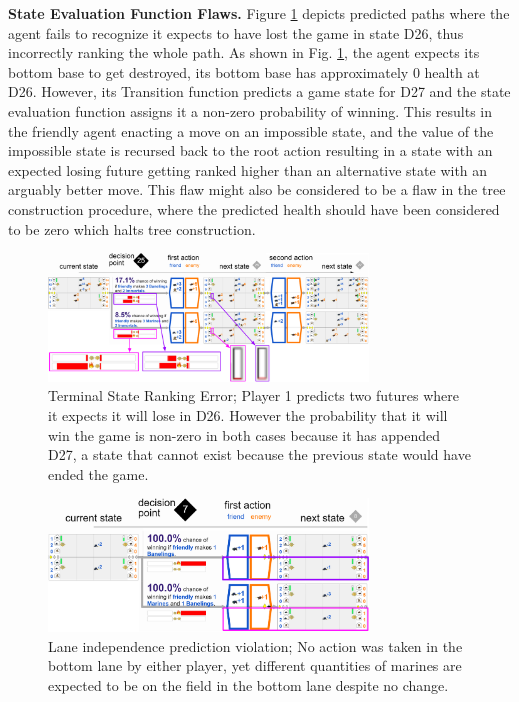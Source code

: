 \documentclass{article}
\begin{document}
{\bf State Evaluation Function Flaws.} Figure \ref{fig:TerminalStateRanking} depicts predicted paths where the agent fails to recognize it expects to have lost the game in state D26, thus incorrectly ranking the whole path. As shown in Fig. \ref{fig:TerminalStateRanking}, the agent expects its bottom base to get destroyed, its bottom base has approximately 0 health at D26. However, its Transition function predicts a game state for D27 and the state evaluation function assigns it a non-zero probability of winning. This results in the friendly agent enacting a move on an impossible state, and the value of the impossible state is recursed back to the root action resulting in a state with an expected losing future getting ranked higher than an alternative state with an arguably better move. This flaw might also be considered to be a flaw in the tree construction procedure, where the predicted health should have been considered to be zero which halts tree construction. 

\begin{figure}[t]
    \centering
    \includegraphics[width=8.5cm]{img/bugs/stateRanking.PNG}
    \caption{Terminal State Ranking Error; Player 1 predicts two futures where it expects it will lose in D26. However the probability that it will win the game is non-zero in both cases because it has appended D27, a state that cannot exist because the previous state would have ended the game.}
    \label{fig:TerminalStateRanking}
\end{figure}

\begin{figure}[t]
    \centering
    \includegraphics[width=8.5cm]{img/bugs/laneIndependence.PNG}
    \caption{Lane independence prediction violation; No action was taken in the bottom lane by either player, yet different quantities of marines are expected to be on the field in the bottom lane despite no change.}
    \label{fig:IndependenceError}
\end{figure}
\end{document}
